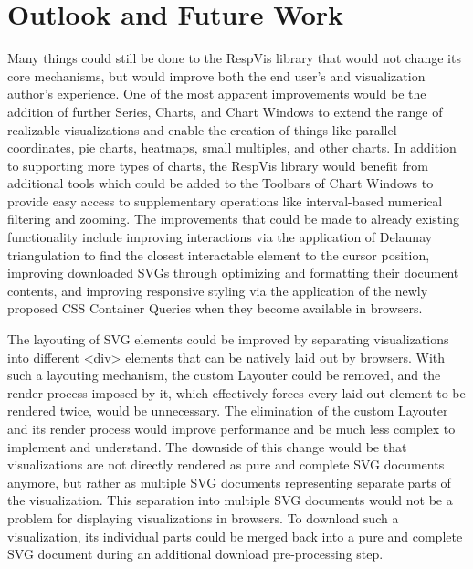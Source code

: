 \chapter{Outlook and Future Work}
\label{chap:Outlook}

Many things could still be done to the RespVis library that would not
change its core mechanisms, but would improve both the end user's and
visualization author's experience. One of the most apparent
improvements would be the addition of further Series, Charts, and
Chart Windows to extend the range of realizable visualizations and
enable the creation of things like parallel coordinates, pie charts,
heatmaps, small multiples, and other charts. In addition to supporting
more types of charts, the RespVis library would benefit from
additional tools which could be added to the Toolbars of Chart Windows
to provide easy access to supplementary operations like interval-based
numerical filtering and zooming. The improvements that could be made
to already existing functionality include improving interactions via
the application of Delaunay triangulation
\parencite{Delaunay,DelaunayAlgorithms} to find the closest
interactable element to the cursor position, improving downloaded SVGs
through optimizing and formatting their document contents, and
improving responsive styling via the application of the newly proposed
CSS Container Queries \parencite{CSSContainment3} when they become
available in browsers.

The layouting of SVG elements could be improved by separating
visualizations into different <div> elements that can be natively laid
out by browsers. With such a layouting mechanism, the custom Layouter
could be removed, and the render process imposed by it, which
effectively forces every laid out element to be rendered twice, would
be unnecessary. The elimination of the custom Layouter and its render
process would improve performance and be much less complex to
implement and understand. The downside of this change would be that
visualizations are not directly rendered as pure and complete SVG
documents anymore, but rather as multiple SVG documents representing
separate parts of the visualization. This separation into multiple SVG
documents would not be a problem for displaying visualizations in
browsers. To download such a visualization, its individual parts could
be merged back into a pure and complete SVG document during an
additional download pre-processing step.

